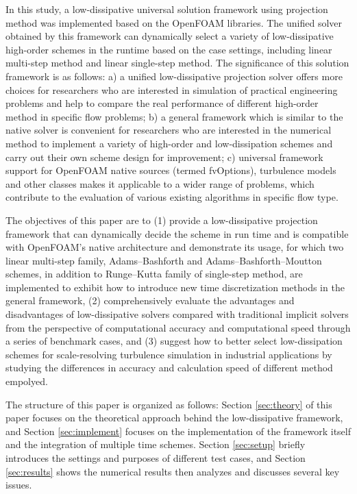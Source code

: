 \documentclass{article}
\begin{document}
In this study, a low-dissipative universal solution framework using projection method was implemented based on the OpenFOAM libraries. The unified solver obtained by this framework can dynamically select a variety of low-dissipative high-order schemes in the runtime based on the case settings, including linear multi-step method and linear single-step method. The significance of this solution framework is as follows: a) a unified low-dissipative projection solver offers more choices for researchers who are interested in simulation of practical engineering problems and help to compare the real performance of different high-order method in specific flow problems; b) a general framework which is similar to the native solver is convenient for researchers who are interested in the numerical method to implement a variety of high-order and low-dissipation schemes and carry out their own scheme design for improvement; c) universal framework support for OpenFOAM native sources (termed fvOptions), turbulence models and other classes makes it applicable to a wider range of problems, which contribute to the evaluation of various existing algorithms in specific flow type.

The objectives of this paper are to (1) provide a low-dissipative projection framework that can dynamically decide the scheme in run time and is compatible with OpenFOAM's native architecture and demonstrate its usage, for which two linear multi-step family, Adams--Bashforth and Adams--Bashforth--Moutton schemes, in addition to Runge--Kutta family of single-step method, are implemented to exhibit how to introduce new time discretization methods in the general framework, (2) comprehensively evaluate the advantages and disadvantages of low-dissipative solvers compared with traditional implicit solvers from the perspective of computational accuracy and computational speed through a series of benchmark cases, and (3) suggest how to better select low-dissipation schemes for scale-resolving turbulence simulation in industrial applications by studying the differences in accuracy and calculation speed of different method empolyed.

The structure of this paper is organized as follows: Section \ref{sec:theory} of this paper focuses on the theoretical approach behind the low-dissipative framework, and Section \ref{sec:implement} focuses on the implementation of the framework itself and the integration of multiple time schemes. Section \ref{sec:setup} briefly introduces the settings and purposes of different test cases, and Section \ref{sec:results} shows the numerical results then analyzes and discusses several key issues.
\end{document}
